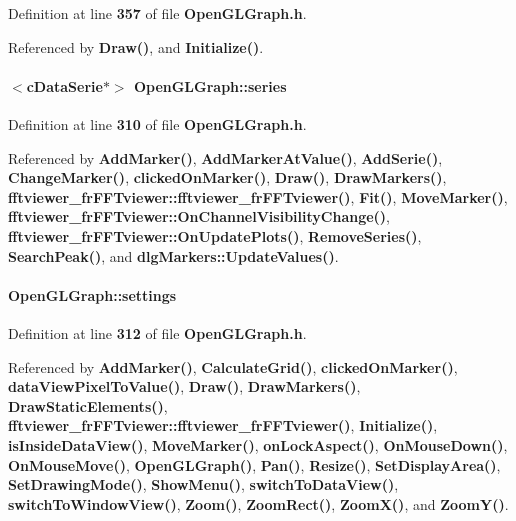 Definition at line {\bf 357} of file {\bf Open\+G\+L\+Graph.\+h}.



Referenced by {\bf Draw()}, and {\bf Initialize()}.

\paragraph[{series}]{$<${\bf c\+Data\+Serie}$\ast$$>$ Open\+G\+L\+Graph\+::series}\label{classOpenGLGraph_a478d0844d89c9775822d4dff6b0141bc}


Definition at line {\bf 310} of file {\bf Open\+G\+L\+Graph.\+h}.



Referenced by {\bf Add\+Marker()}, {\bf Add\+Marker\+At\+Value()}, {\bf Add\+Serie()}, {\bf Change\+Marker()}, {\bf clicked\+On\+Marker()}, {\bf Draw()}, {\bf Draw\+Markers()}, {\bf fftviewer\+\_\+fr\+F\+F\+Tviewer\+::fftviewer\+\_\+fr\+F\+F\+Tviewer()}, {\bf Fit()}, {\bf Move\+Marker()}, {\bf fftviewer\+\_\+fr\+F\+F\+Tviewer\+::\+On\+Channel\+Visibility\+Change()}, {\bf fftviewer\+\_\+fr\+F\+F\+Tviewer\+::\+On\+Update\+Plots()}, {\bf Remove\+Series()}, {\bf Search\+Peak()}, and {\bf dlg\+Markers\+::\+Update\+Values()}.

\paragraph[{settings}]{ Open\+G\+L\+Graph\+::settings}\label{classOpenGLGraph_aa0a9b97cbdf822431c1589c56b882104}


Definition at line {\bf 312} of file {\bf Open\+G\+L\+Graph.\+h}.



Referenced by {\bf Add\+Marker()}, {\bf Calculate\+Grid()}, {\bf clicked\+On\+Marker()}, {\bf data\+View\+Pixel\+To\+Value()}, {\bf Draw()}, {\bf Draw\+Markers()}, {\bf Draw\+Static\+Elements()}, {\bf fftviewer\+\_\+fr\+F\+F\+Tviewer\+::fftviewer\+\_\+fr\+F\+F\+Tviewer()}, {\bf Initialize()}, {\bf is\+Inside\+Data\+View()}, {\bf Move\+Marker()}, {\bf on\+Lock\+Aspect()}, {\bf On\+Mouse\+Down()}, {\bf On\+Mouse\+Move()}, {\bf Open\+G\+L\+Graph()}, {\bf Pan()}, {\bf Resize()}, {\bf Set\+Display\+Area()}, {\bf Set\+Drawing\+Mode()}, {\bf Show\+Menu()}, {\bf switch\+To\+Data\+View()}, {\bf switch\+To\+Window\+View()}, {\bf Zoom()}, {\bf Zoom\+Rect()}, {\bf Zoom\+X()}, and {\bf Zoom\+Y()}.

